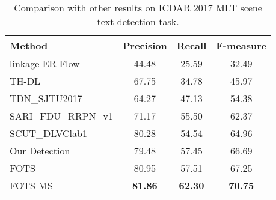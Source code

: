 \documentclass[10pt,twocolumn,letterpaper]{article}
\begin{document}
\begin{table*}
\begin{center}
\begin{tabular}{l|ccc|l|ccc|ccc}
\end{tabular}
\end{center}
\caption{Comparison with other results on ICDAR 2015 with percentage scores. ``FOTS MS'' represents multi-scale testing and ``FOTS RT'' represents our real-time version, which will be discussed in Sec. \ref{speed}. ``End-to-End'' and ``Word Spotting'' are two types of evaluation protocols for text spotting. ``P'', ``R'', ``F'' represent ``Precision'', ``Recall'', ``F-measure'' respectively and ``S'', ``W'', ``G'' represent F-measure using ``Strong'', ``Weak'', ``Generic'' lexicon respectively.}
\label{tab:icdar15_detect_compare}
\end{table*}

\begin{table}
\small
\begin{center}
\begin{tabular}{l|ccc}
\hline
Method    & Precision   & Recall   & F-measure \\ \hline
linkage-ER-Flow \cite{icdar17} & 44.48 & 25.59 & 32.49   \\
TH-DL \cite{icdar17} & 67.75 &	34.78 &	45.97    \\
TDN\_SJTU2017 \cite{icdar17} & 64.27 &	47.13 &	54.38  \\
SARI\_FDU\_RRPN\_v1 \cite{ma2017rcnn} & 71.17 & 55.50 &	62.37   \\
SCUT\_DLVClab1 \cite{icdar17} & 80.28 &	54.54 &	64.96   \\ \hline
Our Detection & 79.48&	57.45&	66.69\\
FOTS & 80.95&	57.51&	67.25    \\
FOTS MS &\textbf{81.86}&\textbf{62.30}&	\textbf{70.75} \\ \hline
\end{tabular}
\end{center}
\caption{Comparison with other results on ICDAR 2017 MLT scene text detection task.}
\label{tab:MLT_detect_compare}
\end{table}
\end{document}
